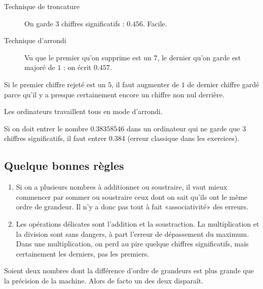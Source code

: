 \begin{description}
	\item[Technique de troncature] On garde \( 3\) chiffres significatifs : \( 0.456\). Facile.
	\item[Technique d'arrondi] Vu que le premier qu'on supprime est un \( 7\), le dernier qu'on garde est majoré de \( 1\) : on écrit \( 0.457\).


\end{description}

Si le premier chiffre rejeté est un \( 5\), il faut augmenter de \( 1\) de dernier chiffre gardé parce qu'il y a presque certainement encore un chiffre non nul derrière.

\begin{remark}
	Les ordinateurs travaillent tous en mode d'arrondi.
\end{remark}

Si on doit entrer le nombre \( 0.38358546\) dans un ordinateur qui ne garde que \( 3\) chiffres significatifs, il faut entrer \( 0.384\) (erreur classique dans les exercices).

\subsection{Quelque bonnes règles}

\begin{enumerate}
	\item
		Si on a plusieurs nombres à additionner ou soustraire, il vaut mieux commencer par sommer ou soustraire ceux dont on sait qu'ils ont le même ordre de grandeur. Il n'y a donc pas tout à fait «associativité» des erreurs.
	\item
		Les opérations délicates sont l'addition et la soustraction. La multiplication et la division sont sans dangers, à part l'erreur de dépassement du maximum. Dans une multiplication, on perd au pire quelque chiffres significatifs, mais certainement les derniers, pas les premiers.
\end{enumerate}

Soient deux nombres dont la différence d'ordre de grandeurs est plus grande que la précision de la machine. Alors de facto un des deux disparaît.

